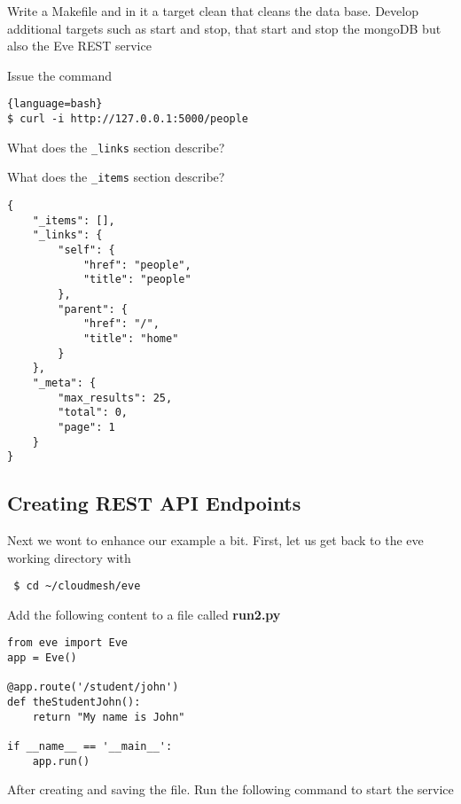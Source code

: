 \begin{exercise}
Write a Makefile and in it a target clean that cleans the data
base. Develop additional targets such as start and stop, that start
and stop the mongoDB but also the Eve REST service
\end{exercise}


\begin{exercise}
Issue the command

\begin{lstlisting}{language=bash}
$ curl -i http://127.0.0.1:5000/people
\end{lstlisting}

What does the \verb|_links| section describe?

What does the \verb|_items| section describe?

\begin{lstlisting}
{
    "_items": [],
    "_links": {
        "self": {
            "href": "people",
            "title": "people"
        },
        "parent": {
            "href": "/",
            "title": "home"
        }
    },
    "_meta": {
        "max_results": 25,
        "total": 0,
        "page": 1
    }
}
\end{lstlisting} 
\end{exercise}

\clearpage

\subsection{Creating REST API Endpoints}\label{s:rest-api-endpoints}

Next we wont to enhance our example a bit. First, let us get back to
the eve working directory with

\begin{lstlisting}
 $ cd ~/cloudmesh/eve
\end{lstlisting}

Add the following content to a file called \textbf{run2.py}

\begin{lstlisting}
from eve import Eve
app = Eve()

@app.route('/student/john')
def theStudentJohn():
    return "My name is John"

if __name__ == '__main__':
    app.run()

\end{lstlisting}

After creating and saving the file. Run the following command to start
the service


